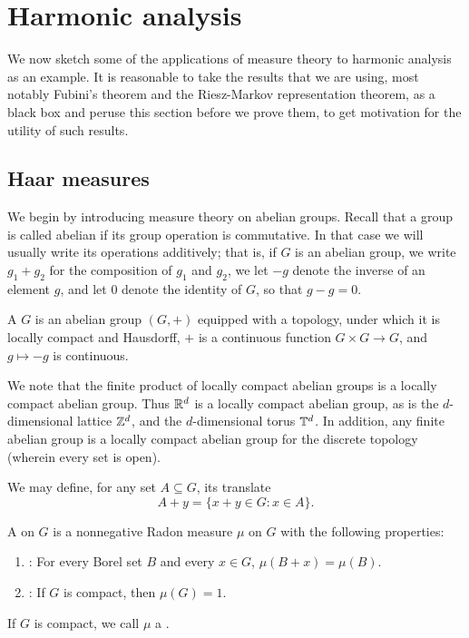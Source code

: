 \chapter{Harmonic analysis}

We now sketch some of the applications of measure theory to harmonic analysis as an example.
It is reasonable to take the results that we are using, most notably Fubini's theorem and the Riesz-Markov representation theorem, as a black box and peruse this section before we prove them, to get motivation for the utility of such results.

\section{Haar measures}
We begin by introducing measure theory on abelian groups. Recall that a group is called abelian if its group operation is commutative.
In that case we will usually write its operations additively; that is, if $G$ is an abelian group, we write $g_1 + g_2$ for the composition of $g_1$ and $g_2$, we let $-g$ denote the inverse of an element $g$, and let $0$ denote the identity of $G$, so that $g - g = 0$.

\begin{definition}
A  $G$ is an abelian group $(G, +)$ equipped with a topology, under which it is locally compact and Hausdorff, $+$ is a continuous function $G \times G \to G$, and $g \mapsto -g$ is continuous.
\end{definition}

We note that the finite product of locally compact abelian groups is a locally compact abelian group.
Thus $\mathbb{R}^d$ is a locally compact abelian group, as is the $d$-dimensional lattice $\mathbb{Z}^d$, and the $d$-dimensional torus $\mathbb{T}^d$.
In addition, any finite abelian group is a locally compact abelian group for the discrete topology (wherein every set is open).

We may define, for any set $A \subseteq G$, its translate
\[A + y = \{x + y \in G: x \in A\}.\]

\begin{definition}
A  on $G$ is a nonnegative Radon measure $\mu$ on $G$ with the following properties:
\begin{enumerate}
\item {}: For every Borel set $B$ and every $x \in G$, $\mu(B+x) = \mu(B)$.
\item {}: If $G$ is compact, then $\mu(G) = 1$.
\end{enumerate}
If $G$ is compact, we call $\mu$ a .
\end{definition}

